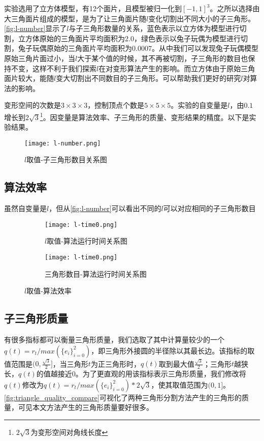 实验选用了立方体模型，有12个面片，且模型被归一化到$[-1, 1]^3$。之所以选择由大三角面片组成的模型，是为了让三角面片随$l$变化切割出不同大小的子三角形。\autoref{fig:l-number}显示了$l$与子三角形数量的关系，蓝色表示以立方体为模型进行切割，立方体原始的三角面片平均面积为2.0，绿色表示以兔子玩偶为模型进行切割，兔子玩偶原始的三角面片平均面积为0.0007。从中我们可以发现兔子玩偶模型原始三角片面过小，当$l$大于某个值的时候，其不再被切割，子三角形的数目也保持不变，这样不利于我们探索$l$在对变形算法产生的影响。而立方体由于原始三角面片较大，能随$l$变大切割出不同数目的子三角形。可以帮助我们更好的研究$l$对算法的影响。

变形空间的次数是$3\times3\times3$，控制顶点个数是$5\times5\times5$。实验的自变量是$l$，由$0.1$增长到$2\sqrt{3}$\footnote{$2\sqrt{3}$为变形空间对角线长度}。因变量是算法效率、子三角形的质量、变形结果的精度。以下是实验结果。

\begin{figure}[htbp]
	\centering
	\texttt{[image: l-number.png]}
	\caption{$l$取值-子三角形数目关系图}\label{fig:l-number}
\end{figure}

\subsection{算法效率}
虽然自变量是$l$，但从\autoref{fig:l-number}可以看出不同的$l$可以对应相同的子三角形数目

\begin{figure}[htbp]
	\centering
	\begin{subfigure}[b]{.45\textwidth}
	    \centering
	    \texttt{[image: l-time0.png]}
	    \caption{$l$取值-算法运行时间关系图}\label{fig:l-time0}
	\end{subfigure}
	\begin{subfigure}[b]{.45\textwidth}
	    \centering
	    \texttt{[image: l-time0.png]}
	    \caption{三角形数目-算法运行时间关系图}\label{fig:l-time1}
	\end{subfigure}
	\caption{$l$取值-算法效率}\label{fig:l-time0}
\end{figure}

\subsection{子三角形质量}
有很多指标都可以衡量三角形质量\cite{pebay2003}，我们选取了其中计算量较少的一个$q(t)=r_t/max(\{e_i\}^{2}_{i=0})$，即三角形外接圆的半径除以其最长边。该指标的取值范围是$(0, \frac{\sqrt{3}}{2}]$，当三角形$t$为正三角形时，$q(t)$取到最大值$\frac{\sqrt{3}}{2}$；三角形$t$越狭长，$q(t)$的值越接近0。为了更直观的用该指标表示三角形质量，我们修改将$q(t)$修改为$q(t)=r_t/max(\{e_i\}^{2}_{i=0})*2\sqrt{3}$，使其取值范围为$(0, 1]$。\autoref{fig:triangle_quality_compare}可视化了两种三角形分割方法产生的三角形的质量，可见本文方法产生的三角形质量要好很多。

